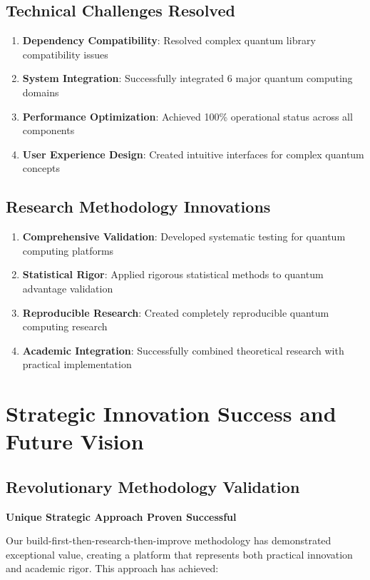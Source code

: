 \documentclass[12pt,a4paper]{article}
\begin{document}
\subsection{Technical Challenges Resolved}

\begin{enumerate}
    \item \textbf{Dependency Compatibility}: Resolved complex quantum library compatibility issues
    \item \textbf{System Integration}: Successfully integrated 6 major quantum computing domains
    \item \textbf{Performance Optimization}: Achieved 100\% operational status across all components
    \item \textbf{User Experience Design}: Created intuitive interfaces for complex quantum concepts
\end{enumerate}

\subsection{Research Methodology Innovations}

\begin{enumerate}
    \item \textbf{Comprehensive Validation}: Developed systematic testing for quantum computing platforms
    \item \textbf{Statistical Rigor}: Applied rigorous statistical methods to quantum advantage validation
    \item \textbf{Reproducible Research}: Created completely reproducible quantum computing research
    \item \textbf{Academic Integration}: Successfully combined theoretical research with practical implementation
\end{enumerate}

\section{Strategic Innovation Success and Future Vision}

\subsection{Revolutionary Methodology Validation}

\textcolor{successgreen}{\textbf{Unique Strategic Approach Proven Successful}}

Our build-first-then-research-then-improve methodology has demonstrated exceptional value, creating a platform that represents both practical innovation and academic rigor. This approach has achieved:
\end{document}
